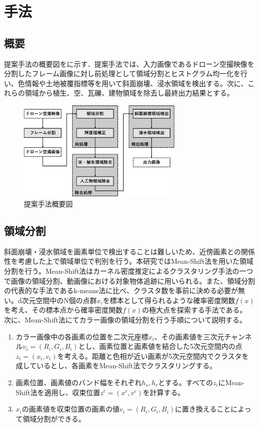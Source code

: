 \documentclass[../Thesis]{subfiles}
\begin{document}
\chapter{手法}
\section{概要}
  提案手法の概要図をに示す．提案手法では、入力画像であるドローン空撮映像を分割したフレーム画像に対し前処理として領域分割とヒストグラム均一化を行い、色情報や土地被覆指標等を用いて斜面崩壊、浸水領域を検出する。次に、これらの領域から植生、空、瓦礫、建物領域を除去し最終出力結果とする。
  	
	\begin{figure}[h]
		\centering
		\includegraphics[width=8cm]{img/howto3.jpg}
		\caption{提案手法概要図}
		\label{img01}
  \end{figure}
  

\section{領域分割}
  斜面崩壊・浸水領域を画素単位で検出することは難しいため、近傍画素との関係性を考慮した上で領域単位で判別を行う。本研究ではMean-Shift法を用いた領域分割を行う。Mean-Shift法はカーネル密度推定によるクラスタリング手法の一つで画像の領域分割、動画像における対象物体追跡に用いられる。また、領域分割の代表的な手法であるk-means法に比べ、クラスタ数を事前に決める必要が無い。d次元空間中のN個の点群$x_i$を標本として得られるような確率密度関数$f(x)$を考え、その標本点から確率密度関数$f(x)$の極大点を探索する手法である。
  次に、Mean-Shift法にてカラー画像の領域分割を行う手順について説明する。

  \begin{enumerate}
    \item カラー画像中の各画素の位置を二次元座標$x_i$、その画素値を三次元チャンネル$v_i=(R_i,G_i,B_i)$とし、画素位置と画素値を結合した5次元空間内の点$z_i=(x_i,v_i)$を考える。距離と色相が近い画素が5次元空間内でクラスタを成しているとし、各画素をMean-Shift法でクラスタリングする。
    \item 画素位置、画素値のバンド幅をそれぞれ$h_s,h_r$とする。すべての$z_i$にMean-Shift法を適用し、収束位置$z^c=(x^c,v^c)$を計算する。
    \item $x_i$の画素値を収束位置の画素の値$v_i=(R_i,G_i,B_i)$に置き換えることによって領域分割ができる。
  \end{enumerate}
  
\end{document}
